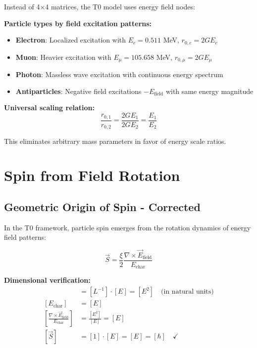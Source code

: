 \documentclass[12pt,a4paper]{report}
\begin{document}
Instead of 4×4 matrices, the T0 model uses energy field nodes:

\textbf{Particle types by field excitation patterns:}
\begin{itemize}
	\item \textbf{Electron}: Localized excitation with $E_e = 0.511$ MeV, $r_{0,e} = 2GE_e$
	\item \textbf{Muon}: Heavier excitation with $E_\mu = 105.658$ MeV, $r_{0,\mu} = 2GE_\mu$  
	\item \textbf{Photon}: Massless wave excitation with continuous energy spectrum
	\item \textbf{Antiparticles}: Negative field excitations $-E_{\text{field}}$ with same energy magnitude
\end{itemize}

\textbf{Universal scaling relation:}
\begin{equation}
	\frac{r_{0,1}}{r_{0,2}} = \frac{2GE_1}{2GE_2} = \frac{E_1}{E_2}
\end{equation}

This eliminates arbitrary mass parameters in favor of energy scale ratios.

\section{Spin from Field Rotation}
\label{sec:spin_from_rotation}

\subsection{Geometric Origin of Spin - Corrected}
\label{subsec:geometric_spin}

In the T0 framework, particle spin emerges from the rotation dynamics of energy field patterns:

\begin{equation}
	\vec{S} = \frac{\xi}{2} \frac{\nabla \times \vec{E}_{\text{field}}}{E_{\text{char}}}
	\label{eq:spin_energy_field_corrected}
\end{equation}

\textbf{Dimensional verification:}
\begin{align}
	[\nabla \times \vec{E}_{\text{field}}] &= [L^{-1}] \cdot [E] = [E^2] \quad \text{(in natural units)} \\
	[E_{\text{char}}] &= [E] \\
	\left[\frac{\nabla \times \vec{E}_{\text{field}}}{E_{\text{char}}}\right] &= \frac{[E^2]}{[E]} = [E] \\
	[\vec{S}] &= [1] \cdot [E] = [E] = [\hbar] \quad \checkmark
\end{align}
\end{document}
